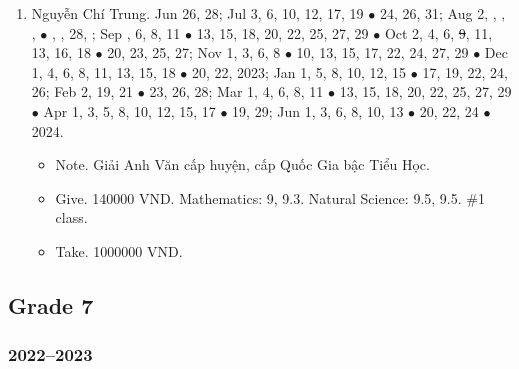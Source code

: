 \documentclass{article}
\begin{document}
\begin{enumerate}
	\item {\sc Nguyễn Chí Trung.} {\sf[In]} Jun 26, 28; Jul 3, 6, 10, 12, 17, 19 $\bullet$ 24, 26, 31; Aug 2, , , ,  $\bullet$ , , 28, ; Sep , 6, 8, 11 $\bullet$ 13, 15, 18, 20, 22, 25, 27, 29 $\bullet$ Oct 2, 4, 6, \st{9}, 11, 13, 16, 18 $\bullet$ 20, 23, 25, 27; Nov 1, 3, 6, 8 $\bullet$ 10, 13, 15, 17, 22, 24, 27, 29 $\bullet$ Dec 1, 4, 6, 8, 11, 13, 15, 18 $\bullet$ 20, 22, 2023; Jan 1, 5, 8, 10, 12, 15 $\bullet$ 17, 19, 22, 24, 26; Feb 2, 19, 21 $\bullet$ 23, 26, 28; Mar 1, 4, 6, 8, 11 $\bullet$ 13, 15, 18, 20, 22, 25, 27, 29 $\bullet$ Apr 1, 3, 5, 8, 10, 12, 15, 17 $\bullet$ 19, 29; Jun 1, 3, 6, 8, 10, 13 $\bullet$ 20, 22, 24 $\bullet$ 2024.
	\begin{itemize}
		\item {\sf Note.} Giải Anh Văn cấp huyện, cấp Quốc Gia bậc Tiểu Học.
		\item {\sf Give.} 140000 VND. Mathematics: 9, 9.3. Natural Science: 9.5, 9.5. \#1 class.
		\item {\sf Take.} 1000000 VND.
	\end{itemize}
\end{enumerate}


\subsection{Grade 7}

\subsubsection{2022--2023}
\end{document}
